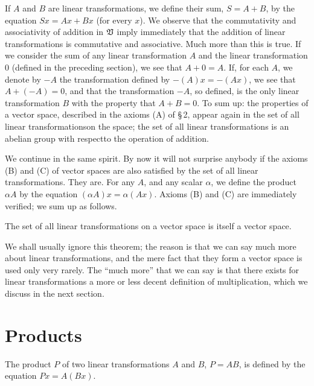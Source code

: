If \(A\) and \(B\) are linear transformations, we define their sum, \(S = A +
B\), by the equation \(Sx = Ax + Bx\) (for every \(x\)). We observe that the
commutativity and associativity of addition in \(\frak{V}\) imply immediately
that the addition of linear transformations is commutative and associative. Much
more than this is true. If we consider the sum of any linear transformation
\(A\) and the linear transformation \(0\) (defined in the preceding section), we
see that \(A + 0 = A\). If, for each \(A\), we denote by \(-A\) the
transformation defined by \(-(A)x = - (Ax)\), we see that \(A + (-A) = 0\), and
that the transformation \(-A\), so defined, is the only linear transformation
\(B\) with the property that \(A+ B= 0\). To sum up: the properties of a vector
space, described in the axioms (A) of \S\,2, appear again in the set of all
linear transformationson the space; the set of all linear transformations is an
abelian group with respectto the operation of addition.

We continue in the same spirit. By now it will not surprise anybody if the
axioms (B) and (C) of vector spaces are also satisfied by the set of all linear
transformations. They are. For any \(A\), and any scalar \(\alpha\), we define
the product \(\alpha A\) by the equation \((\alpha A) x = \alpha (Ax)\). Axioms
(B) and (C) are immediately verified; we sum up as follows.

\begin{theorem}
    The set of all linear transformations on a vector space is itself a vector
    space.
\end{theorem}

We shall usually ignore this theorem; the reason is that we can say
much more about linear transformations, and the mere fact that they form a
vector space is used only very rarely. The ``much more'' that we can say is that
there exists for linear transformations a more or less decent definition of
multiplication, which we discuss in the next section.

\section{Products}

The product \(P\) of two linear transformations \(A\) and \(B\), \(P = AB\), is
defined by the equation \(P x = A(Bx)\).

